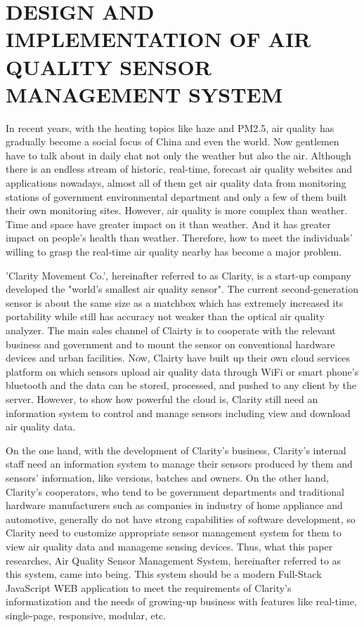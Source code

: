 
\chapter{DESIGN AND IMPLEMENTATION OF AIR QUALITY SENSOR MANAGEMENT SYSTEM}

In recent years, with the heating topics like haze and PM2.5, air quality has gradually become a social focus of China and even the world. Now gentlemen have to talk about in daily chat not only the weather but also the air. Although there is an endless stream of historic, real-time, forecast air quality websites and applications nowadays, almost all of them get air quality data from monitoring stations of government environmental department and only a few of them built their own monitoring sites. However, air quality is more complex than weather. Time and space have greater impact on it than weather. And it has greater impact on people's health than weather. Therefore, how to meet the individuals' willing to grasp the real-time air quality nearby has become a major problem.

'Clarity Movement Co.', hereinafter referred to as Clarity, is a start-up company developed the "world's smallest air quality sensor". The current second-generation sensor is about the same size as a matchbox which has extremely increased its portability while still has accuracy not weaker than the optical air quality analyzer. The main sales channel of Clairty is to cooperate with the relevant business and government and to mount the sensor on conventional hardware devices and urban facilities. Now, Clairty have built up their own cloud services platform on which sensors upload air quality data through WiFi or smart phone's bluetooth and the data can be stored, processed, and pushed to any client by the server. However, to show how powerful the cloud is, Clarity still need an information system to control and manage sensors including view and download air quality data.

On the one hand, with the development of Clarity's business, Clarity's internal staff need an information system to manage their sensors produced by them and sensors' information, like versions, batches and owners. On the other hand, Clarity's cooperators, who tend to be government departments and traditional hardware manufacturers such as companies in industry of home appliance and automotive, generally do not have strong capabilities of software development, so Clarity need to customize appropriate sensor management system for them to view air quality data and manageme sensing devices. Thus, what this paper researches, Air Quality Sensor Management System, hereinafter referred to as this system, came into being. This system should be a modern Full-Stack JavaScript WEB application to meet the requirements of Clarity's informatization and the needs of growing-up business with features like real-time, single-page, responsive, modular, etc.

